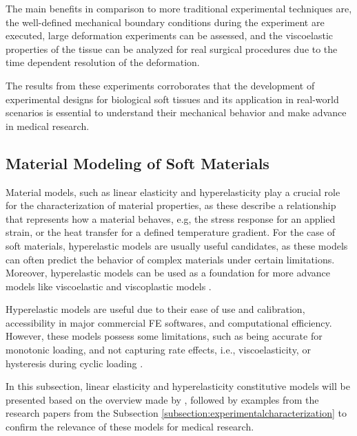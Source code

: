 The main benefits in comparison to more traditional experimental techniques are, 
the well-defined mechanical boundary conditions during the experiment are executed, 
large deformation experiments can be assessed, and the viscoelastic
properties of the tissue can be analyzed for real surgical procedures due to 
the time dependent resolution of the deformation.

The results from these experiments corroborates that the development of experimental designs for
biological soft tissues and its application in real-world scenarios is essential to understand 
their mechanical behavior and make advance in medical research.

\subsection{Material Modeling of Soft Materials}
\label{subsection:materialmodeling} 

Material models, such as linear elasticity and hyperelasticity play a crucial role for the characterization 
of material properties, as these describe a relationship that represents how a material behaves, e.g, 
the stress response for an applied strain, or the heat transfer for a defined temperature gradient.
For the case of soft materials, hyperelastic models are usually 
useful candidates, as these models can often predict the behavior of complex materials under certain limitations.
Moreover, hyperelastic models can be used as a foundation for more advance models like 
viscoelastic and viscoplastic models \cite{Bergström2015}. 

Hyperelastic models are useful due to their ease of use and calibration, accessibility in major commercial FE softwares, 
and computational efficiency. However, these models possess some limitations, such as being 
accurate for monotonic loading, and not capturing rate effects, i.e., viscoelasticity, or 
hysteresis during cyclic loading \cite{Bergström2015}.

In this subsection, linear elasticity and hyperelasticity constitutive models will be presented 
based on the overview made by \citet{Bergström2015}, followed by examples from the research 
papers from the Subsection \ref{subsection:experimentalcharacterization} to confirm the relevance of these 
models for medical research.

